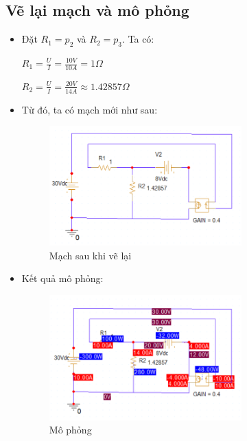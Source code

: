 \subsection{Vẽ lại mạch và mô phỏng}
\begin{itemize}
    \item Đặt \(R_1 = p_2\) và \(R_2 = p_3\). Ta có: 

\(R_1 = \frac{U}{I} = \frac{10V}{10A} = 1\Omega\)

\(R_2 = \frac{U}{I} = \frac{20V}{14A} \approx 1.42857\Omega\)
\newpage

    \item Từ đó, ta có mạch mới như sau: 
\begin{figure}[!htbp]
    \centering
    \includegraphics[width=0.7\textwidth]{graphics/ex8/f2.png}
    \caption{Mạch sau khi vẽ lại}
\end{figure}

    \item  Kết quả mô phỏng:
\begin{figure}[!htbp]
    \centering
    \includegraphics[width=0.7\textwidth]{graphics/ex8/f3.png}
    \caption{Mô phỏng}
\end{figure}

\end{itemize}